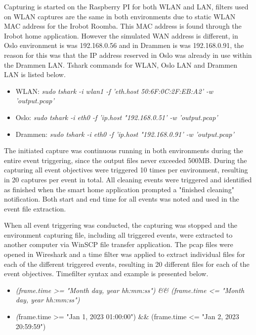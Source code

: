  Capturing is started on the Raspberry PI for both \gls{WLAN} and \gls{LAN}, filters used on \gls{WLAN} captures are the same in both environments due to static \gls{WLAN} \gls{MAC} address for the Irobot Roomba. This \gls{MAC} address is found through the Irobot home application. However the simulated \gls{WAN} address is different, in Oslo environment is was 192.168.0.56 and in Drammen is was 192.168.0.91, the reason for this was that the \gls{IP} address reserved in Oslo was already in use within the Drammen \gls{LAN}. Tshark commands for \gls{WLAN}, Oslo \gls{LAN} and Drammen \gls{LAN} is listed below. 

 \begin{itemize}
     \item \gls{WLAN}: \textit{sudo tshark -i wlan1 -f 'eth.host 50:6F:0C:2F:EB:A2' -w 'output.pcap'}
     \item Oslo: \textit{sudo tshark -i eth0 -f 'ip.host "192.168.0.51' -w 'output.pcap'}
     \item Drammen: \textit{sudo tshark -i eth0 -f 'ip.host "192.168.0.91' -w 'output.pcap'}
 \end{itemize}

 The initiated capture was continuous running in both environments during the entire event triggering, since the output files never exceeded 500MB. During the capturing all event objectives were triggered 10 times per environment, resulting in 20 captures per event in total. All cleaning events were triggered and identified as finished when the smart home application prompted a "finished cleaning" notification. Both start and end time for all events was noted and used in the event file extraction. 

 When all event triggering was conducted, the capturing was stopped and the environment capturing file, including all triggered events, were extracted to another computer via WinSCP file transfer application. The pcap files were opened in Wireshark and a time filter was applied to extract individual files for each of the different triggered events, resulting in 20 different files for each of the event objectives. Timefilter syntax and example is presented below. 
 \begin{itemize}
     \item \textit{(frame.time >= "Month day, year hh:mm:ss") \&\& (frame.time <= "Month day, year hh:mm:ss") }
     \item \textit(frame.time >= "Jan 1, 2023 01:00:00") \&\& (frame.time <= "Jan 2, 2023 20:59:59") 
 \end{itemize}

